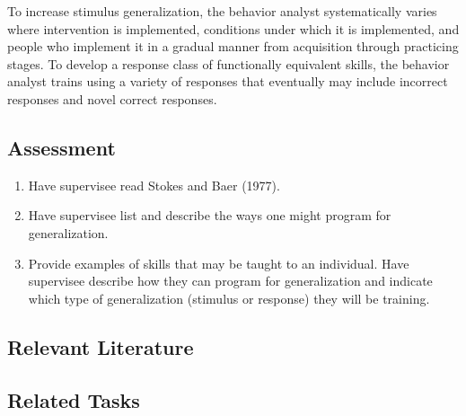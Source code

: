 To increase stimulus generalization, the behavior analyst systematically varies where intervention is implemented, conditions under which it is implemented, and people who implement it in a gradual manner from acquisition through practicing stages. To develop a response class of functionally equivalent skills, the behavior analyst trains using a variety of responses that eventually may include incorrect responses and novel correct responses.
%
\subsection{Assessment}
\begin{enumerate}
\item Have supervisee read Stokes and Baer (1977).
\item Have supervisee list and describe the ways one might program for generalization.
\item Provide examples of skills that may be taught to an individual. Have supervisee describe how they can program for generalization and indicate which type of generalization (stimulus or response) they will be training.
\end{enumerate}
%
%
%
%
%
\subsection{Relevant Literature}
\begin{refsection}
\nocite{test,alang2017police,clayton2018black}
\printbibliography[heading=none]
\end{refsection}
%
\subsection{Related Tasks}
\foureTwo{}\\
\fouriSix{}\\
\fourjTwo{}\\
\fourjTwelve{}\\
\fourFKEleven{}\\
\fourFKTwelve{}\\
\fourFKTwentyFour{}\\
\fourFKThirtySix{}\\
%
%
%
%
%
%
%
%
